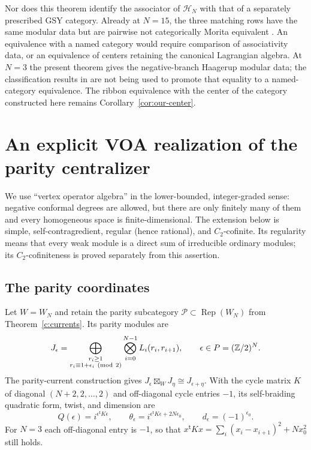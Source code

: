 \documentclass[11pt,a4paper]{article}
\numberwithin{equation}{section}
\theoremstyle{definition}\newtheorem{definition}[theorem]{Definition}
\theoremstyle{remark}\newtheorem{remark}[theorem]{Remark}
\begin{document}
Nor does this theorem identify the associator of $\mathcal H_N$
with that of a separately prescribed GSY category. Already at
$N=15$, the three matching rows have the same modular data but
are pairwise not categorically Morita equivalent
\cite[Corollary 5.9]{gsy}. An equivalence with a named category
would require comparison of associativity data, or an equivalence
of centers retaining the canonical Lagrangian algebra. At $N=3$
the present theorem gives the negative-branch Haagerup modular data;
the classification results in
\cite{grossmansnyder,grossmanizumi} are not being used to promote
that equality to a named-category equivalence. The ribbon
equivalence with the center of the category constructed here
remains Corollary~\ref{cor:our-center}.


\section{An explicit VOA realization of the parity centralizer}
\label{audit:paritycancellation}

We use ``vertex operator algebra'' in the lower-bounded, integer-graded
sense: negative conformal degrees are allowed, but there are only
finitely many of them and every homogeneous space is finite-dimensional.
The extension below is simple, self-contragredient, regular
(hence rational), and $C_2$-cofinite. Its regularity means that every
weak module is a direct sum of irreducible ordinary modules; its
$C_2$-cofiniteness is proved separately from this assertion.

\subsection{The parity coordinates}

Let $W=W_N$ and retain the parity subcategory
$\mathcal P\subset\operatorname{Rep}(W_N)$ from
Theorem~\ref{c:currents}.
Its parity modules are
\[
 J_\epsilon=
 \bigoplus_{\substack{r_i\geq1\cr r_i\equiv1+\epsilon_i\ ({\rm mod}\ 2)}}
       \bigotimes_{i=0}^{N-1}L_i(r_i,r_{i+1}),
 \qquad \epsilon\in P=(\mathbb Z/2)^N.
\]
The parity-current construction gives
$J_\epsilon\boxtimes_WJ_\eta\cong J_{\epsilon+\eta}$.
With the cycle matrix $K$ of diagonal $(N+2,2,\ldots,2)$ and
off-diagonal cycle entries $-1$, its self-braiding quadratic form,
twist, and dimension are
\begin{equation}\label{audit:paritydata}
 Q(\epsilon)=i^{\epsilon^{\mathsf t}K\epsilon},\qquad
 \theta_\epsilon=i^{\epsilon^{\mathsf t}K\epsilon+2N\epsilon_0},
 \qquad d_\epsilon=(-1)^{\epsilon_0}.
\end{equation}
For $N=3$ each off-diagonal entry is $-1$, so that
$x^{\mathsf t}Kx=\sum_i(x_i-x_{i+1})^2+Nx_0^2$ still holds.
\end{document}
